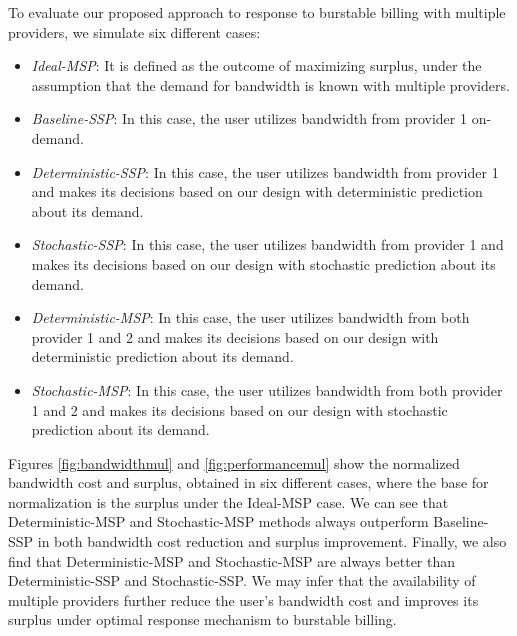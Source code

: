 \documentclass[10pt,journal,compsoc]{IEEEtran}
\begin{document}
To evaluate our proposed approach to response to burstable billing with multiple providers, we simulate six different cases:
\begin{itemize}
\item \emph{Ideal-MSP}: It is defined as the outcome of maximizing surplus, under the assumption that the demand for bandwidth is known with multiple providers.  

\item \emph{Baseline-SSP}: In this case, the user utilizes bandwidth from provider 1 on-demand.

\item \emph{Deterministic-SSP}: In this case, the user utilizes bandwidth from provider 1 and makes its decisions
based on our design with deterministic prediction about its demand. 

\item \emph{Stochastic-SSP}: In this case, the user utilizes bandwidth from provider 1 and makes its decisions
based on our design with stochastic prediction about its demand. 

\item \emph{Deterministic-MSP}: In this case, the user utilizes bandwidth from both provider 1 and 2 and makes its decisions
based on our design with deterministic prediction about its demand. 

\item \emph{Stochastic-MSP}: In this case, the user utilizes bandwidth from both provider 1 and 2 and makes its decisions
based on our design with stochastic prediction about its demand. 
\end{itemize}



Figures  \ref{fig:bandwidthmul} and  \ref{fig:performancemul} show the normalized bandwidth cost and surplus, obtained in six different cases, where the base for normalization is the surplus under the Ideal-MSP case. We can see that Deterministic-MSP and Stochastic-MSP methods always outperform Baseline-SSP in both bandwidth cost reduction and surplus improvement. 
Finally, we  also find that Deterministic-MSP and Stochastic-MSP are always better than Deterministic-SSP and Stochastic-SSP. We  may infer  that the availability of multiple providers further reduce the user's bandwidth cost and improves its surplus under optimal response mechanism to burstable billing.
\end{document}
